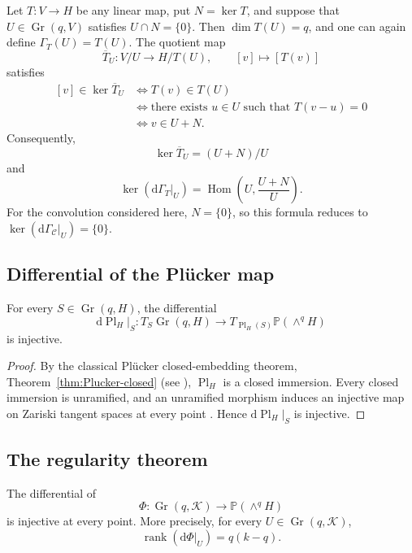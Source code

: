 \documentclass{siamonline250211}
\newcommand{\PP}{\mathbb P}
\newcommand{\Gr}{\operatorname{Gr}}
\newcommand{\Pl}{\operatorname{Pl}}
\newcommand{\Hom}{\operatorname{Hom}}
\newcommand{\rank}{\operatorname{rank}}
\newcommand{\cK}{\mathcal K}
\newcommand{\cC}{\mathcal C}
\newcommand{\dd}{\mathrm d}
\begin{document}
\begin{remark}
\label{rem:general-kernel}
Let $T:V\to H$ be any linear map, put $N=\ker T$, and suppose that
$U\in\Gr(q,V)$ satisfies $U\cap N=\{0\}$. Then $\dim T(U)=q$, and one can
again define $\Gamma_T(U)=T(U)$. The quotient map
\[
  \overline T_U:V/U\longrightarrow H/T(U),
  \qquad[v]\longmapsto[T(v)]
\]
satisfies
\[
\begin{aligned}
  [v]\in\ker\overline T_U
  &\Longleftrightarrow T(v)\in T(U)\\
  &\Longleftrightarrow \text{there exists }u\in U\text{ such that }T(v-u)=0\\
  &\Longleftrightarrow v\in U+N.
\end{aligned}
\]
Consequently,
\[
  \ker\overline T_U=(U+N)/U
\]
and
\[
  \ker(\dd\Gamma_T|_U)
  =\Hom\left(U,\frac{U+N}{U}\right).
\]
For the convolution considered here, $N=\{0\}$, so this formula reduces to
$\ker(\dd\Gamma_{\cC}|_U)=\{0\}$.
\end{remark}

\subsection{Differential of the Pl\texorpdfstring{\"u}{u}cker map}

\begin{proposition}\label{prop:dPlucker-injective}
For every $S\in\Gr(q,H)$, the differential
\[
  \dd\Pl_H|_S:T_S\Gr(q,H)\longrightarrow
  T_{\Pl_H(S)}\PP(\wedge^qH)
\]
is injective.
\end{proposition}

\begin{proof}
By the classical Pl\"ucker closed-embedding theorem,
Theorem~\ref{thm:Plucker-closed} (see
\cite[Lecture~6, pp.~63--67]{Har92}), $\Pl_H$ is a closed immersion.
Every closed immersion is unramified, and an unramified morphism induces an
injective map on Zariski tangent spaces at every point
\cite[Tags~04XV and 0B2G]{Stacks}. Hence $\dd\Pl_H|_S$ is injective.
\end{proof}

\subsection{The regularity theorem}

\begin{theorem}
\label{thm:regularity}
The differential of
\[
  \Phi:\Gr(q,\cK)\longrightarrow\PP(\wedge^qH)
\]
is injective at every point. More precisely, for every
$U\in\Gr(q,\cK)$,
\[
  \rank(\dd\Phi|_U)=q(k-q).
\]
\end{theorem}
\end{document}
